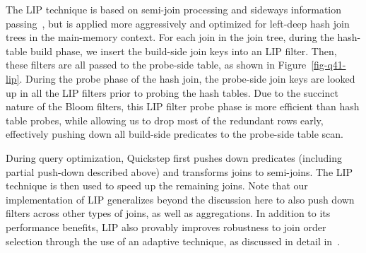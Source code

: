 The LIP technique is based on semi-join processing and sideways information passing~\cite{Bernstein1981SemiJoin, Ives2008Sideways, Beeri1987Magic}, but is applied more aggressively and optimized for left-deep hash join trees in the main-memory context. For each join in the join tree, during the hash-table build phase, we insert the build-side join keys into an LIP filter. Then, these filters are all passed to the probe-side table, as shown in Figure~\ref{fig-q41-lip}. During the probe phase of the hash join, the probe-side join keys are looked up in all the LIP filters prior to probing the hash tables. Due to the succinct nature of the Bloom filters, this LIP filter probe phase is more efficient than hash table probes, while allowing us to drop most of the redundant rows early, %
effectively pushing down all build-side predicates to the probe-side table scan.

During query optimization, Quickstep first pushes down predicates (including partial push-down described above) and transforms joins to semi-joins. The LIP technique is then used to speed up the remaining joins. Note that our implementation of LIP generalizes beyond the discussion here to also push down filters across other types of joins, as well as aggregations. In addition to its performance benefits, LIP also provably improves robustness to join order selection through the use of an adaptive technique, as discussed in detail in~\cite{DBLP:journals/pvldb/ZhuPSP17}.

